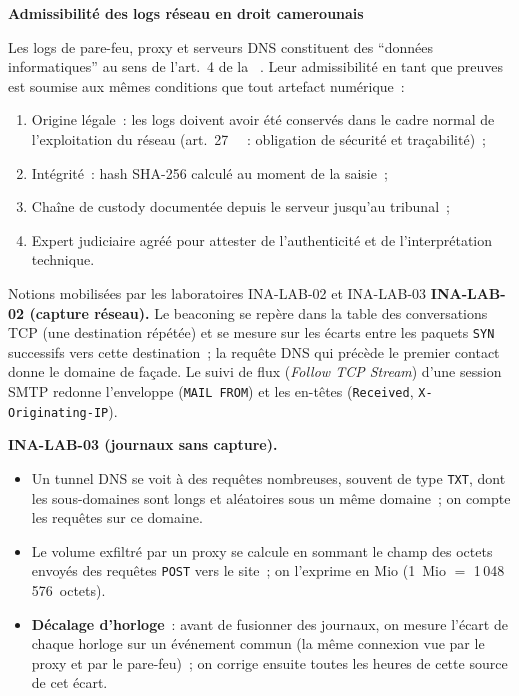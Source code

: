 \begin{boxjuris}
\textbf{Admissibilité des logs réseau en droit camerounais}

Les logs de pare-feu, proxy et serveurs DNS constituent des ``données
informatiques'' au sens de l'art.~4 de la ~\cite{cameroun2010a}.
Leur admissibilité en tant que preuves est soumise aux mêmes
conditions que tout artefact numérique~:
\begin{enumerate}
    \item Origine légale~: les logs doivent avoir été conservés dans
          le cadre normal de l'exploitation du réseau (art.~27
          ~\cite{cameroun2024donnees}~: obligation de sécurité et traçabilité)~;
    \item Intégrité~: hash SHA-256 calculé au moment de la saisie~;
    \item Chaîne de custody documentée depuis le serveur jusqu'au
          tribunal~;
    \item Expert judiciaire agréé pour attester de l'authenticité
          et de l'interprétation technique.
\end{enumerate}
\end{boxjuris}

\separateur

\begin{boiteRemarque}{Notions mobilisées par les laboratoires INA-LAB-02 et INA-LAB-03}
\textbf{INA-LAB-02 (capture réseau).} Le beaconing se repère dans la table
des conversations TCP (une destination répétée) et se mesure sur les écarts
entre les paquets \texttt{SYN} successifs vers cette destination~; la
requête DNS qui précède le premier contact donne le domaine de façade. Le
suivi de flux (\emph{Follow TCP Stream}) d'une session SMTP redonne
l'enveloppe (\texttt{MAIL FROM}) et les en-têtes (\texttt{Received},
\texttt{X-Originating-IP}).

\medskip
\textbf{INA-LAB-03 (journaux sans capture).}
\begin{itemize}
    \item Un tunnel DNS se voit à des requêtes nombreuses, souvent de type
          \texttt{TXT}, dont les sous-domaines sont longs et aléatoires sous
          un même domaine~; on compte les requêtes sur ce domaine.
    \item Le volume exfiltré par un proxy se calcule en sommant le champ des
          octets envoyés des requêtes \texttt{POST} vers le site~; on
          l'exprime en Mio (1~Mio $=$ 1\,048\,576~octets).
    \item \textbf{Décalage d'horloge}~: avant de fusionner des journaux, on
          mesure l'écart de chaque horloge sur un événement commun (la même
          connexion vue par le proxy et par le pare-feu)~; on corrige ensuite
          toutes les heures de cette source de cet écart.
\end{itemize}
\end{boiteRemarque}

